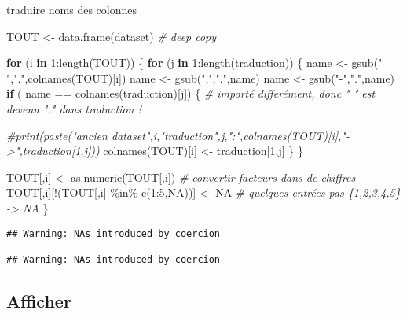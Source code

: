 \documentclass[
]{article}
\newenvironment{Shaded}{\begin{snugshade}}{\end{snugshade}}
\newcommand{\CommentTok}[1]{\textcolor[rgb]{0.56,0.35,0.01}{\textit{#1}}}
\newcommand{\ConstantTok}[1]{\textcolor[rgb]{0.00,0.00,0.00}{#1}}
\newcommand{\ControlFlowTok}[1]{\textcolor[rgb]{0.13,0.29,0.53}{\textbf{#1}}}
\newcommand{\DecValTok}[1]{\textcolor[rgb]{0.00,0.00,0.81}{#1}}
\newcommand{\FunctionTok}[1]{\textcolor[rgb]{0.00,0.00,0.00}{#1}}
\newcommand{\NormalTok}[1]{#1}
\newcommand{\OtherTok}[1]{\textcolor[rgb]{0.56,0.35,0.01}{#1}}
\newcommand{\SpecialCharTok}[1]{\textcolor[rgb]{0.00,0.00,0.00}{#1}}
\newcommand{\StringTok}[1]{\textcolor[rgb]{0.31,0.60,0.02}{#1}}
\begin{document}
traduire noms des colonnes

\begin{Shaded}
\begin{Highlighting}[]
\NormalTok{TOUT }\OtherTok{\textless{}{-}} \FunctionTok{data.frame}\NormalTok{(dataset)  }\CommentTok{\# deep copy}

\ControlFlowTok{for}\NormalTok{ (i }\ControlFlowTok{in} \DecValTok{1}\SpecialCharTok{:}\FunctionTok{length}\NormalTok{(TOUT)) \{}
  \ControlFlowTok{for}\NormalTok{ (j }\ControlFlowTok{in} \DecValTok{1}\SpecialCharTok{:}\FunctionTok{length}\NormalTok{(traduction)) \{}
\NormalTok{    name }\OtherTok{\textless{}{-}} \FunctionTok{gsub}\NormalTok{(}\StringTok{" "}\NormalTok{,}\StringTok{"."}\NormalTok{,}\FunctionTok{colnames}\NormalTok{(TOUT)[i])}
\NormalTok{    name }\OtherTok{\textless{}{-}} \FunctionTok{gsub}\NormalTok{(}\StringTok{","}\NormalTok{,}\StringTok{"."}\NormalTok{,name)}
\NormalTok{    name }\OtherTok{\textless{}{-}} \FunctionTok{gsub}\NormalTok{(}\StringTok{"{-}"}\NormalTok{,}\StringTok{"."}\NormalTok{,name)}
    \ControlFlowTok{if}\NormalTok{ ( name }\SpecialCharTok{==}  \FunctionTok{colnames}\NormalTok{(traduction)[j]) \{}
      \CommentTok{\# importé differément, donc " " est devenu "." dans traduction !}
      
      \CommentTok{\#print(paste("ancien dataset",i,"traduction",j,":",colnames(TOUT)[i],"{-}\textgreater{}",traduction[1,j]))}
      \FunctionTok{colnames}\NormalTok{(TOUT)[i] }\OtherTok{\textless{}{-}}\NormalTok{ traduction[}\DecValTok{1}\NormalTok{,j]}
\NormalTok{    \}}
\NormalTok{  \}}
  
\NormalTok{  TOUT[,i] }\OtherTok{\textless{}{-}} \FunctionTok{as.numeric}\NormalTok{(TOUT[,i])              }\CommentTok{\# convertir facteurs dans de chiffres}
\NormalTok{  TOUT[,i][}\SpecialCharTok{!}\NormalTok{(TOUT[,i] }\SpecialCharTok{\%in\%} \FunctionTok{c}\NormalTok{(}\DecValTok{1}\SpecialCharTok{:}\DecValTok{5}\NormalTok{,}\ConstantTok{NA}\NormalTok{))] }\OtherTok{\textless{}{-}} \ConstantTok{NA}    \CommentTok{\# quelques entrées pas \{1,2,3,4,5\} {-}\textgreater{} NA}
\NormalTok{\}}
\end{Highlighting}
\end{Shaded}

\begin{verbatim}
## Warning: NAs introduced by coercion

## Warning: NAs introduced by coercion
\end{verbatim}

\hypertarget{afficher}{%
\subsection{Afficher}\label{afficher}}
\end{document}
